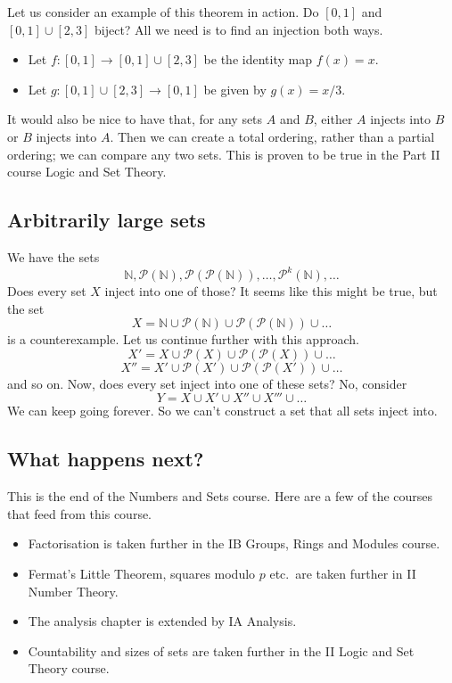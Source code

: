 Let us consider an example of this theorem in action.
Do \([0, 1]\) and \([0,1]\cup[2,3]\) biject?
All we need is to find an injection both ways.
\begin{itemize}
	\item Let \(f\colon [0,1] \to [0,1] \cup [2,3]\) be the identity map \(f(x) = x\).
	\item Let \(g\colon [0,1] \cup [2,3] \to [0,1]\) be given by \(g(x) = x/3\).
\end{itemize}

It would also be nice to have that, for any sets \(A\) and \(B\), either \(A\) injects into \(B\) or \(B\) injects into \(A\).
Then we can create a total ordering, rather than a partial ordering; we can compare any two sets.
This is proven to be true in the Part II course Logic and Set Theory.

\subsection{Arbitrarily large sets}
We have the sets
\[
	\mathbb N, \mathcal P(\mathbb N), \mathcal P(\mathcal P(\mathbb N)), \dots, \mathcal P^k(\mathbb N), \dots
\]
Does every set \(X\) inject into one of those?
It seems like this might be true, but the set
\[
	X = \mathbb N \cup \mathcal P(\mathbb N) \cup \mathcal P(\mathcal P(\mathbb N)) \cup \dots
\]
is a counterexample.
Let us continue further with this approach.
\[
	X' = X \cup \mathcal P(X) \cup \mathcal P(\mathcal P(X)) \cup \dots
\]
\[
	X'' = X' \cup \mathcal P(X') \cup \mathcal P(\mathcal P(X')) \cup \dots
\]
and so on.
Now, does every set inject into one of these sets?
No, consider
\[
	Y = X \cup X' \cup X'' \cup X''' \cup \dots
\]
We can keep going forever.
So we can't construct a set that all sets inject into.

\subsection{What happens next?}
This is the end of the Numbers and Sets course.
Here are a few of the courses that feed from this course.
\begin{itemize}
	\item Factorisation is taken further in the IB Groups, Rings and Modules course.
	\item Fermat's Little Theorem, squares modulo \(p\) etc.\ are taken further in II Number Theory.
	\item The analysis chapter is extended by IA Analysis.
	\item Countability and sizes of sets are taken further in the II Logic and Set Theory course.
\end{itemize}
